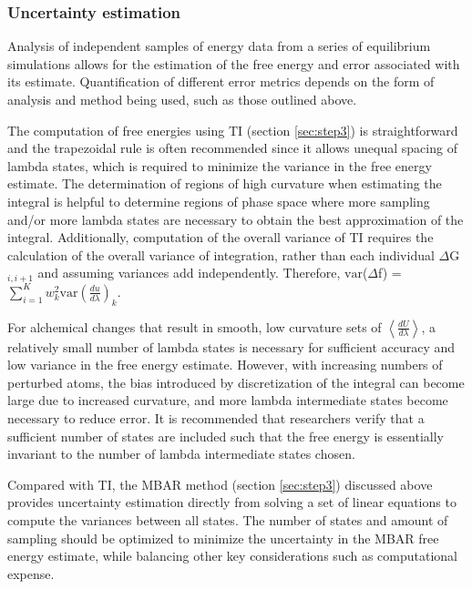 \documentclass[9pt,bestpractices]{livecoms}
\newcommand{\expect}[1]{\left\langle{#1}\right\rangle}
\begin{document}

\subsubsection{Uncertainty estimation}

Analysis of independent samples of energy data from a series of equilibrium simulations allows for the estimation of the free energy and error associated with its estimate. 
Quantification of different error metrics depends on the form of analysis and method being used, such as those outlined above.

The computation of free energies using TI (section \ref{sec:step3}) is straightforward and the trapezoidal rule is often recommended since it allows unequal spacing of lambda states, which is required to minimize the variance in the free energy estimate. 
The determination of regions of high curvature when estimating the integral is helpful to determine regions of phase space where more sampling and/or more lambda states are necessary to obtain the best approximation of the integral.
Additionally, computation of the overall variance of TI requires the calculation of the overall variance of integration, rather than each individual $\Delta$G$_{i,i+1}$ and assuming variances add independently. 
Therefore, $\mathrm{var}$($\Delta$f) = $\sum_{i=1}^{K}w_{k}^2 \mathrm{var}(\frac{du}{d\lambda})_{k}$.

For alchemical changes that result in smooth, low curvature sets of $\expect{\frac{dU}{d\lambda}}$, a relatively small number of lambda states is necessary for sufficient accuracy and low variance in the free energy estimate. 
However, with increasing numbers of perturbed atoms, the bias introduced by discretization of the integral can become large due to increased curvature, and more lambda intermediate states become necessary to reduce error. 
It is recommended that researchers verify that a sufficient number of states are included such that the free energy is essentially invariant to the number of lambda intermediate states chosen.


Compared with TI, the MBAR method (section \ref{sec:step3}) discussed above provides uncertainty estimation directly from solving a set of linear equations to compute the variances between all states. 
The number of states and amount of sampling should be optimized to minimize the uncertainty in the MBAR free energy estimate, while balancing other key considerations such as computational expense. 
\end{document}
